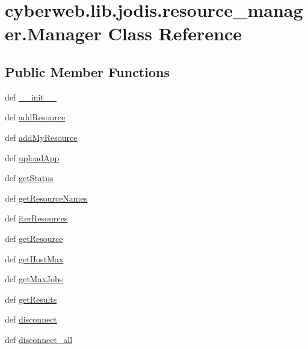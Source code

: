 \hypertarget{classcyberweb_1_1lib_1_1jodis_1_1resource__manager_1_1_manager}{\section{cyberweb.\-lib.\-jodis.\-resource\-\_\-manager.\-Manager \-Class \-Reference}
\label{classcyberweb_1_1lib_1_1jodis_1_1resource__manager_1_1_manager}
}
\subsection*{\-Public \-Member \-Functions}
\begin{DoxyCompactItemize}
\item 
def \hyperlink{classcyberweb_1_1lib_1_1jodis_1_1resource__manager_1_1_manager_a77126d6711baa05ebdf6cced2809b42a}{\-\_\-\-\_\-init\-\_\-\-\_\-}
\item 
def \hyperlink{classcyberweb_1_1lib_1_1jodis_1_1resource__manager_1_1_manager_a2012f57edf3fc65e1387581b0f7d3af7}{add\-Resource}
\item 
def \hyperlink{classcyberweb_1_1lib_1_1jodis_1_1resource__manager_1_1_manager_a1e3d3a234a59a05f0b314cdac91333a6}{add\-My\-Resource}
\item 
def \hyperlink{classcyberweb_1_1lib_1_1jodis_1_1resource__manager_1_1_manager_a6a2ddd48c57f24b5b70d2361f70e848c}{upload\-App}
\item 
def \hyperlink{classcyberweb_1_1lib_1_1jodis_1_1resource__manager_1_1_manager_adb43da28810c0632562cd23207123acf}{get\-Status}
\item 
def \hyperlink{classcyberweb_1_1lib_1_1jodis_1_1resource__manager_1_1_manager_ad556bf9d35ca1482e6991d2a88638fa4}{get\-Resource\-Names}
\item 
def \hyperlink{classcyberweb_1_1lib_1_1jodis_1_1resource__manager_1_1_manager_a182ca90e3c1aa534ca6d8b22fe5d0e1b}{iter\-Resources}
\item 
def \hyperlink{classcyberweb_1_1lib_1_1jodis_1_1resource__manager_1_1_manager_a6fc952f5743fb63538be611797b6d66a}{get\-Resource}
\item 
def \hyperlink{classcyberweb_1_1lib_1_1jodis_1_1resource__manager_1_1_manager_a3a44e919baec06a75e55a92f3f442af0}{get\-Host\-Max}
\item 
def \hyperlink{classcyberweb_1_1lib_1_1jodis_1_1resource__manager_1_1_manager_aca3c1bcaa9b2d46e2a8443959ab3072e}{get\-Max\-Jobs}
\item 
def \hyperlink{classcyberweb_1_1lib_1_1jodis_1_1resource__manager_1_1_manager_a60dd1ff129381e22dae434564df4829e}{get\-Results}
\item 
def \hyperlink{classcyberweb_1_1lib_1_1jodis_1_1resource__manager_1_1_manager_af24f41a1c5d79c0ea958435c136bc5c1}{disconnect}
\item 
def \hyperlink{classcyberweb_1_1lib_1_1jodis_1_1resource__manager_1_1_manager_ab2662def4f1175a74ea746d04a6b7c92}{disconnect\-\_\-all}
\end{DoxyCompactItemize}

